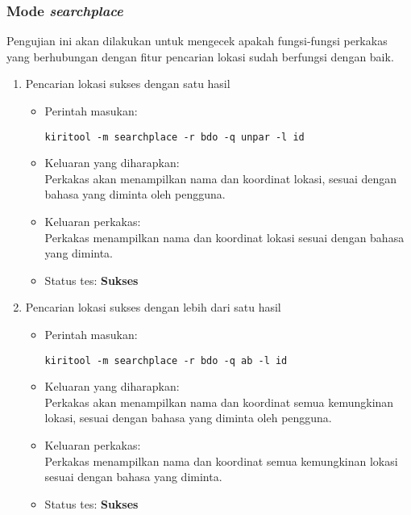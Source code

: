 \subsubsection{Mode \textit{searchplace}}
\label{sec:testing-experiments-testing-searchplace}

Pengujian ini akan dilakukan untuk mengecek apakah fungsi-fungsi perkakas yang berhubungan dengan fitur pencarian lokasi sudah berfungsi dengan baik.

\begin{enumerate}
	\item Pencarian lokasi sukses dengan satu hasil
	\begin{itemize}
		\item Perintah masukan:
		\begin{verbatim}
kiritool -m searchplace -r bdo -q unpar -l id
		\end{verbatim}
		\item Keluaran yang diharapkan: \\
		Perkakas akan menampilkan nama dan koordinat \latlon lokasi, sesuai dengan bahasa yang diminta oleh pengguna.
		\item Keluaran perkakas: \\
		Perkakas menampilkan nama dan koordinat \latlon lokasi sesuai dengan bahasa yang diminta.
		\item Status tes: \textbf{Sukses}
	\end{itemize}
	
	\item Pencarian lokasi sukses dengan lebih dari satu hasil
	\begin{itemize}
		\item Perintah masukan:
		\begin{verbatim}
kiritool -m searchplace -r bdo -q ab -l id
		\end{verbatim}
		\item Keluaran yang diharapkan: \\
		Perkakas akan menampilkan nama dan koordinat \latlon semua kemungkinan lokasi, sesuai dengan bahasa yang diminta oleh pengguna.
		\item Keluaran perkakas: \\
		Perkakas menampilkan nama dan koordinat \latlon semua kemungkinan lokasi sesuai dengan bahasa yang diminta.
		\item Status tes: \textbf{Sukses}
	\end{itemize}
	

\end{enumerate}
